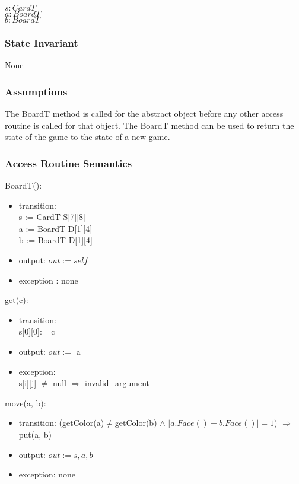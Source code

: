 \documentclass[12pt]{article}
\begin{document}
$s : CardT$\\
$a : BoardT$\\
$b : BoardT$

\subsubsection* {State Invariant}

None

\subsubsection* {Assumptions}

The BoardT method is called for the abstract object before any other access routine is called for that
object.  The BoardT method can be used to return the state of the game to the state of a new game.

\subsubsection* {Access Routine Semantics}

BoardT():
\begin{itemize}
	\item transition:\\ 
	s := CardT S[7][8] \\
	a := BoardT D[1][4] \\
	b := BoardT D[1][4]
	
	\item output:
	$out := \mathit{self}$
	\item exception :
	none
	
\end{itemize}

get(c):
\begin{itemize}
	\item transition:\\ 
	s[0][0]:= c
	\item output: 
	$out :=$ a
	\item exception:\\
	s[i][j] $\neq$ null $\Rightarrow$ invalid\_argument
\end{itemize}

move(a, b):
\begin{itemize}
	\item transition:
	(getColor(a)$\neq$getColor(b) $\land$ $|a.Face()-b.Face()|=1$) $\Rightarrow$ put(a, b)
	
	\item output: 
	$out := s,a,b$
	\item exception:
	none
\end{itemize}
\end{document}
